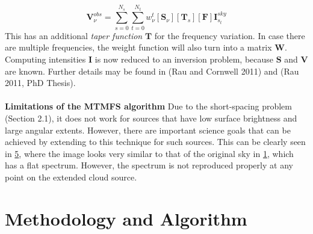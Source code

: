 \documentclass[twocolumn]{aastex61}
\begin{document}
\begin{equation}
\textbf{V}_{\nu}^{obs} = \sum_{s=0}^{N_s}\sum_{t=0}^{N_t}w_\nu^{t}[\textbf{S}_{\nu}][\textbf{T}_s][\textbf{F}]\textbf{I}^{sky}_{s_{t}}
\end{equation}
This has an additional \textit{taper function} $\textbf{T}$ for the frequency variation. In case there are multiple frequencies, the weight function will also turn into a matrix $\textbf{W}$. Computing intensities $\textbf{I}$ is now reduced to an inversion problem, because $\textbf{S}$ and $\textbf{V}$ are known. Further details may be found in (Rau and Cornwell 2011) and (Rau 2011, PhD Thesis).\\\\ 
\textbf{Limitations of the MTMFS algorithm} 
Due to the short-spacing problem (Section 2.1), it does not work
for sources that have low surface brightness and large angular extents. However, there are important science goals that can be achieved by extending to this technique for such sources. This can be clearly seen in \hyperref[ 5]{\figurename{ 5}}, where the image looks very similar to that of the original sky in \hyperref[ 1]{\figurename{ 1}}, which has a flat spectrum. However, the spectrum is not reproduced properly at any point on the extended cloud source.
\section{Methodology and Algorithm}
\end{document}
